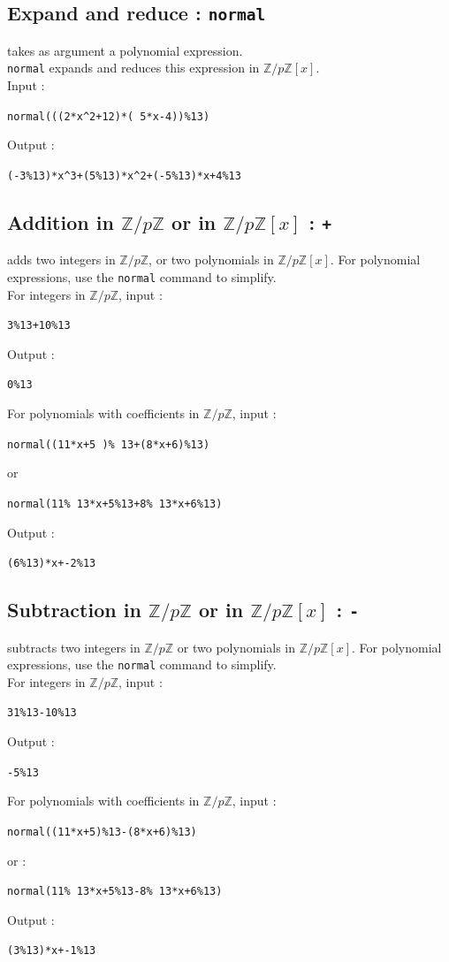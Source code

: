 \documentclass[a4paper,11pt]{book}
\newcommand{\Z}{{\mathbb{Z}}}
\begin{document}
\subsection{Expand and reduce : {\tt normal}}
 takes as argument a polynomial expression.\\
{\tt normal} expands and  reduces this expression in $\Z/p\Z[x]$.\\
Input :
\begin{center}{\tt normal(((2*x\verb|^|2+12)*( 5*x-4))\%13)}\end{center}
Output :
\begin{center}{\tt (-3\%13)*x\verb|^|3+(5\%13)*x\verb|^|2+(-5\%13)*x+4\%13}\end{center}

\subsection{Addition in $\Z/p\Z$ or in $ \Z/p\Z[x]$ : {\tt +}}\index{+}
\noindent{\tt +} adds two integers in $\Z/p\Z$, or
two polynomials in $\Z/p\Z[x]$. For polynomial expressions, 
use the {\tt normal} command to simplify.\\
For integers in $\Z/p\Z$, input :
\begin{center}{\tt 3\%13+10\%13}\end{center}
Output :
\begin{center}{\tt 0\%13}\end{center}
For polynomials with coefficients in $\Z/p\Z$, input :
\begin{center}{\tt normal((11*x+5 )\% 13+(8*x+6)\%13)}\end{center} 
or 
\begin{center}{\tt normal(11\% 13*x+5\%13+8\% 13*x+6\%13)}\end{center} 
Output :
\begin{center}{\tt  (6\%13)*x+-2\%13}\end{center}

\subsection{Subtraction in $\Z/p\Z$ or in $ \Z/p\Z[x]$ : {\tt -}}
\noindent{\tt -} subtracts two integers in $\Z/p\Z$ or
two polynomials in $\Z/p\Z[x]$. For polynomial expressions, 
use the {\tt normal} command to simplify.\\ 
For integers in $\Z/p\Z$, input :
\begin{center}{\tt 31\%13-10\%13}\end{center}
Output :
\begin{center}{\tt  -5\%13}\end{center}
For polynomials with coefficients in $\Z/p\Z$, input :
\begin{center}{\tt normal((11*x+5)\%13-(8*x+6)\%13)}\end{center}
or : 
\begin{center}{\tt normal(11\% 13*x+5\%13-8\% 13*x+6\%13)}\end{center} 
Output :
\begin{center}{\tt  (3\%13)*x+-1\%13}\end{center}
\end{document}

